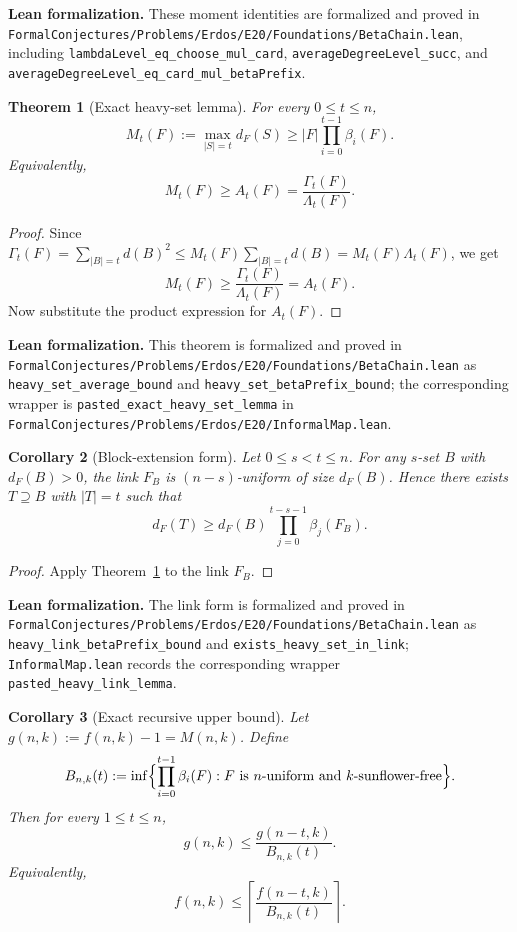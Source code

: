\documentclass[11pt]{article}
\newtheorem{theorem}{Theorem}[section]
\newtheorem{corollary}[theorem]{Corollary}
\theoremstyle{definition}
\newcommand{\1}{\mathbf{1}}
\newcommand{\leannote}[1]{\par\smallskip\noindent\textbf{Lean formalization.} #1\par\smallskip}
\begin{document}
\leannote{These moment identities are formalized and proved in \texttt{FormalConjectures/Problems/Erdos/E20/Foundations/BetaChain.lean}, including \texttt{lambdaLevel\_eq\_choose\_mul\_card}, \texttt{averageDegreeLevel\_succ}, and \texttt{averageDegreeLevel\_eq\_card\_mul\_betaPrefix}.}

\begin{theorem}[Exact heavy-set lemma]\label{thm:heavy-set}
For every $0\le t\le n$,
\[
M_t(F):=\max_{|S|=t} d_F(S)
\ge
|F|\prod_{i=0}^{t-1}\beta_i(F).
\]
Equivalently,
\[
M_t(F)\ge A_t(F)=\frac{\Gamma_t(F)}{\Lambda_t(F)}.
\]
\end{theorem}

\begin{proof}
Since $\Gamma_t(F)=\sum_{|B|=t} d(B)^2\le M_t(F)\sum_{|B|=t} d(B)=M_t(F)\Lambda_t(F)$, we get
\[
M_t(F)\ge \frac{\Gamma_t(F)}{\Lambda_t(F)}=A_t(F).
\]
Now substitute the product expression for $A_t(F)$.
\end{proof}

\leannote{This theorem is formalized and proved in \texttt{FormalConjectures/Problems/Erdos/E20/Foundations/BetaChain.lean} as \texttt{heavy\_set\_average\_bound} and \texttt{heavy\_set\_betaPrefix\_bound}; the corresponding wrapper is \texttt{pasted\_exact\_heavy\_set\_lemma} in \texttt{FormalConjectures/Problems/Erdos/E20/InformalMap.lean}.}

\begin{corollary}[Block-extension form]
Let $0\le s<t\le n$. For any $s$-set $B$ with $d_F(B)>0$, the link $F_B$ is $(n-s)$-uniform of size $d_F(B)$. Hence there exists $T\supseteq B$ with $|T|=t$ such that
\[
d_F(T)\ge d_F(B)\prod_{j=0}^{t-s-1} \beta_j(F_B).
\]
\end{corollary}

\begin{proof}
Apply Theorem~\ref{thm:heavy-set} to the link $F_B$.
\end{proof}

\leannote{The link form is formalized and proved in \texttt{FormalConjectures/Problems/Erdos/E20/Foundations/BetaChain.lean} as \texttt{heavy\_link\_betaPrefix\_bound} and \texttt{exists\_heavy\_set\_in\_link}; \texttt{InformalMap.lean} records the corresponding wrapper \texttt{pasted\_heavy\_link\_lemma}.}

\begin{corollary}[Exact recursive upper bound]\label{cor:exact-recursion}
Let $g(n,k):=f(n,k)-1=M(n,k)$. Define
\[
B_{n,k}(t):=\inf\Bigl\{\prod_{i=0}^{t-1}\beta_i(F): F\text{ is $n$-uniform and $k$-sunflower-free}\Bigr\}.
\]
Then for every $1\le t\le n$,
\[
g(n,k)\le \frac{g(n-t,k)}{B_{n,k}(t)}.
\]
Equivalently,
\[
f(n,k)\le \left\lceil \frac{f(n-t,k)}{B_{n,k}(t)}\right\rceil.
\]
\end{corollary}
\end{document}

